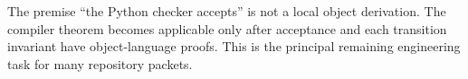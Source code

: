 \begin{warning}
The premise ``the Python checker accepts'' is not a local object derivation.  The compiler theorem becomes applicable only after acceptance and each transition invariant have object-language proofs.  This is the principal remaining engineering task for many repository packets.
\end{warning}

